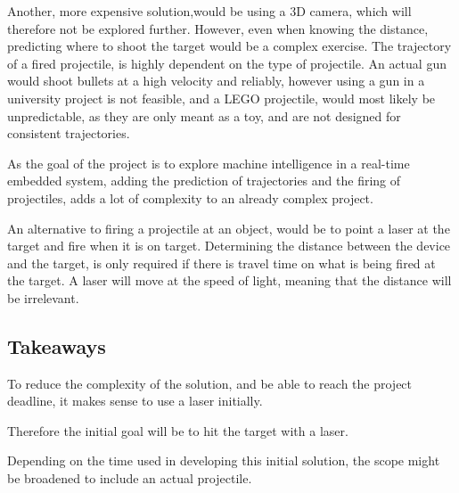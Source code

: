 Another, more expensive solution,would be using a 3D camera, which will therefore not be explored further.
However, even when knowing the distance, predicting where to shoot the target would be a complex exercise.
The trajectory of a fired projectile, is highly dependent on the type of projectile.
An actual gun would shoot bullets at a high velocity and reliably, however using a gun in a university project is not feasible, and a LEGO projectile, would most likely be unpredictable, as they are only meant as a toy, and are not designed for consistent trajectories.


As the goal of the project is to explore machine intelligence in a real-time embedded system, adding the prediction of trajectories and the firing of projectiles, adds a lot of complexity to an already complex project.

An alternative to firing a projectile at an object, would be to point a laser at the target and fire when it is on target.
Determining the distance between the device and the target, is only required if there is travel time on what is being fired at the target.
A laser will move at the speed of light, meaning that the distance will be irrelevant.


\subsection{Takeaways}\label{anal:laser:takeaway}
To reduce the complexity of the solution, and be able to reach the project deadline, it makes sense to use a laser initially. 

Therefore the initial goal will be to hit the target with a laser.

Depending on the time used in developing this initial solution, the scope might be broadened to include an actual projectile.

